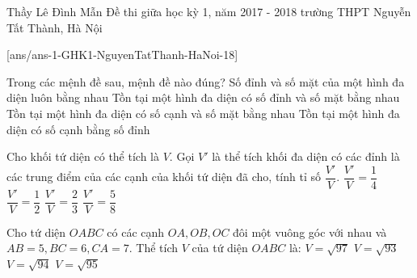 \begin{name}
	{Thầy Lê Đình Mẫn}
		{Đề thi giữa học kỳ 1, năm 2017 - 2018 trường THPT Nguyễn Tất Thành, Hà Nội}
\end{name}
\setcounter{ex}{0}
[ans/ans-1-GHK1-NguyenTatThanh-HaNoi-18]
\begin{ex}%
Trong các mệnh đề sau, mệnh đề nào đúng?
\choice
{Số đỉnh và số mặt của một hình đa diện luôn bằng nhau}
{\True Tồn tại một hình đa diện có số đỉnh và số mặt bằng nhau}
{Tồn tại một hình đa diện có số cạnh và số mặt bằng nhau}
{Tồn tại một hình đa diện có số cạnh bằng số đỉnh}
\end{ex}
\begin{ex}%
Cho khối tứ diện có thể tích là $V$. Gọi $V'$ là thể tích khối đa diện có các đỉnh là các trung điểm của các cạnh của khối tứ diện đã cho, tính tỉ số $\dfrac{V'}{V}$.
\choice
{$\dfrac{V'}{V}=\dfrac{1}{4}$}
{\True $\dfrac{V'}{V}=\dfrac{1}{2}$}
{$\dfrac{V'}{V}=\dfrac{2}{3}$}
{$\dfrac{V'}{V}=\dfrac{5}{8}$}
\end{ex}
\begin{ex}%
Cho tứ diện $OABC$ có các cạnh $OA,OB,OC$ đôi một vuông góc với nhau và $AB=5,BC=6,CA=7$. Thể tích $V$ của tứ diện $OABC$ là:
\choice
{$V=\sqrt{97}$}
{$V=\sqrt{93}$}
{$V=\sqrt{94}$}
{\True $V=\sqrt{95}$}
\end{ex}
